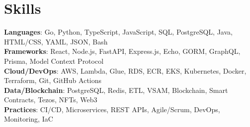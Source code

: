 \documentclass[letterpaper,11pt]{article}
\begin{document}
\section{Skills}
 \begin{itemize}[leftmargin=0.15in, label={}]
    \small{\item{
     \textbf{Languages}{: Go, Python, TypeScript, JavaScript, SQL, PostgreSQL, Java, HTML/CSS, YAML, JSON, Bash} \\
     \textbf{Frameworks}{: React, Node.js, FastAPI, Express.js, Echo, GORM, GraphQL, Prisma, Model Context Protocol} \\
     \textbf{Cloud/DevOps}{: AWS, Lambda, Glue, RDS, ECR, EKS, Kubernetes, Docker, Terraform, Git, GitHub Actions} \\
     \textbf{Data/Blockchain}{: PostgreSQL, Redis, ETL, VSAM, Blockchain, Smart Contracts, Tezos, NFTs, Web3} \\
     \textbf{Practices}{: CI/CD, Microservices, REST APIs, Agile/Scrum, DevOps, Monitoring, IaC} \\
    }}
 \end{itemize}


%

\end{document}
